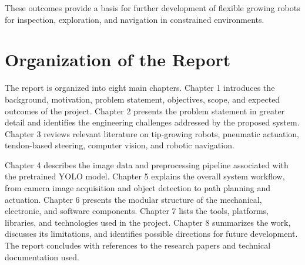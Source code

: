 These outcomes provide a basis for further development of flexible growing robots for inspection, exploration, and navigation in constrained environments.

\section{Organization of the Report}

The report is organized into eight main chapters. Chapter 1 introduces the background, motivation, problem statement, objectives, scope, and expected outcomes of the project. Chapter 2 presents the problem statement in greater detail and identifies the engineering challenges addressed by the proposed system. Chapter 3 reviews relevant literature on tip-growing robots, pneumatic actuation, tendon-based steering, computer vision, and robotic navigation.

Chapter 4 describes the image data and preprocessing pipeline associated with the pretrained YOLO model. Chapter 5 explains the overall system workflow, from camera image acquisition and object detection to path planning and actuation. Chapter 6 presents the modular structure of the mechanical, electronic, and software components. Chapter 7 lists the tools, platforms, libraries, and technologies used in the project. Chapter 8 summarizes the work, discusses its limitations, and identifies possible directions for future development. The report concludes with references to the research papers and technical documentation used.